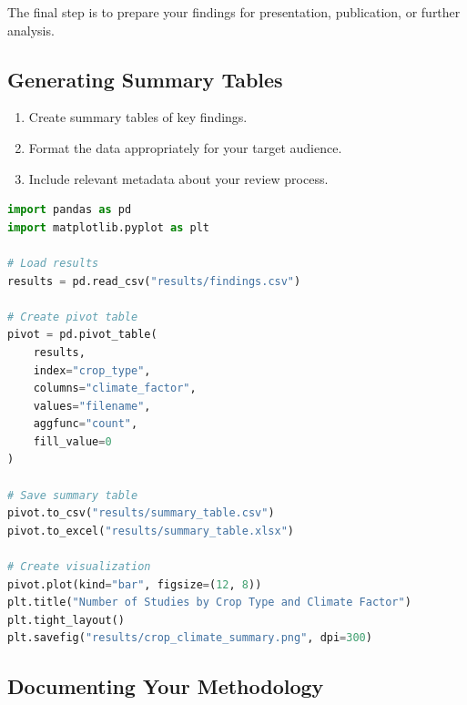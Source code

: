 The final step is to prepare your findings for presentation, publication, or further analysis.

\subsection{Generating Summary Tables}

\begin{enumerate}
    \item Create summary tables of key findings.
    \item Format the data appropriately for your target audience.
    \item Include relevant metadata about your review process.
\end{enumerate}

\begin{commandbox}
\begin{lstlisting}[language=Python]
import pandas as pd
import matplotlib.pyplot as plt

# Load results
results = pd.read_csv("results/findings.csv")

# Create pivot table
pivot = pd.pivot_table(
    results,
    index="crop_type",
    columns="climate_factor",
    values="filename",
    aggfunc="count",
    fill_value=0
)

# Save summary table
pivot.to_csv("results/summary_table.csv")
pivot.to_excel("results/summary_table.xlsx")

# Create visualization
pivot.plot(kind="bar", figsize=(12, 8))
plt.title("Number of Studies by Crop Type and Climate Factor")
plt.tight_layout()
plt.savefig("results/crop_climate_summary.png", dpi=300)
\end{lstlisting}
\end{commandbox}

\subsection{Documenting Your Methodology}

